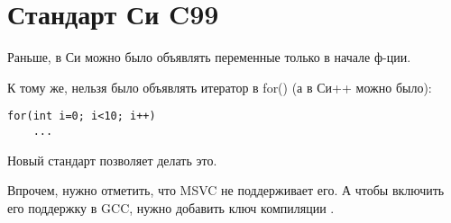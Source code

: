 ﻿\chapter{Стандарт Си C99}

Раньше, в Си можно было объявлять переменные только в начале ф-ции.

К тому же, нельзя было объявлять итератор в for() (а в Си++ можно было):

\begin{lstlisting}
for(int i=0; i<10; i++)
	...
\end{lstlisting}

Новый стандарт\cite{C99TC3} позволяет делать это.

Впрочем, нужно отметить, что MSVC не поддерживает его. А чтобы включить его поддержку в GCC, нужно добавить ключ
компиляции .

